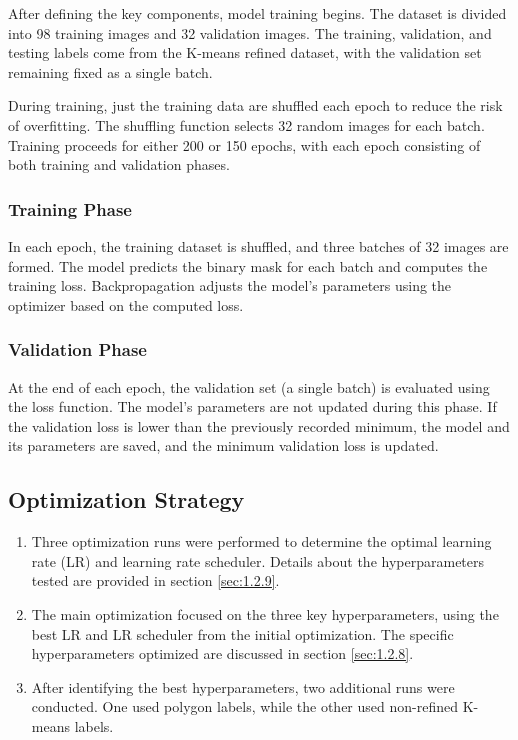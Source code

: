 After defining the key components, model training begins. The dataset is divided into 98 training images and 32 validation images. The training, validation, and testing labels come from the K-means refined dataset, with the validation set remaining fixed as a single batch.

During training, just the training data are shuffled each epoch to reduce the risk of overfitting. The shuffling function selects 32 random images for each batch. Training proceeds for either 200 or 150 epochs, with each epoch consisting of both training and validation phases.

\subsubsection{Training Phase}

In each epoch, the training dataset is shuffled, and three batches of 32 images are formed. The model predicts the binary mask for each batch and computes the training loss. Backpropagation adjusts the model's parameters using the optimizer based on the computed loss.

\subsubsection{Validation Phase}

At the end of each epoch, the validation set (a single batch) is evaluated using the loss function. The model's parameters are not updated during this phase. If the validation loss is lower than the previously recorded minimum, the model and its parameters are saved, and the minimum validation loss is updated.

\subsection{Optimization Strategy}

\begin{enumerate}
    \item Three optimization runs were performed to determine the optimal learning rate (LR) and learning rate scheduler. Details about the hyperparameters tested are provided in section \ref{sec:1.2.9}.
    \item The main optimization focused on the three key hyperparameters, using the best LR and LR scheduler from the initial optimization. The specific hyperparameters optimized are discussed in section \ref{sec:1.2.8}.
    \item After identifying the best hyperparameters, two additional runs were conducted. One used polygon labels, while the other used non-refined K-means labels.
\end{enumerate}
